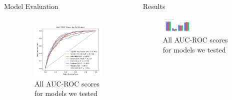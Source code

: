 \documentclass[final]{beamer}
\newlength{\sepwidth}
\newlength{\colwidth}
\newcommand{\separatorcolumn}{\begin{column}{\sepwidth}\end{column}}
\begin{document}
\begin{frame}[t]
\begin{columns}[t]
\begin{column}{\colwidth}
\begin{block}{Model Evaluation}
\begin{columns}
\begin{column}{0.5\textwidth}
\end{column}
\begin{column}{0.5\textwidth}
\begin{center}
      \begin{figure}[H]
        \includegraphics[width=\textwidth]{figure/auc_roc_all_models.png}
        \caption{All AUC-ROC scores for models we tested}
        \label{fig:accounts_df}
    \end{figure}
\end{center}
\end{column}
\end{columns}
  \end{block}
\end{column}

\separatorcolumn

\begin{column}{\colwidth}

  \begin{exampleblock}{Results}
\\
    \begin{center}
      \begin{figure}[H]
        \includegraphics[width=0.4\textwidth]{figure/classification_report_xgboost.png}
        \caption{All AUC-ROC scores for models we tested}
        \label{fig:accounts_df}
      \end{figure}
    \end{center}
    

\end{exampleblock}
\end{column}
\end{columns}
\end{frame}
\end{document}
